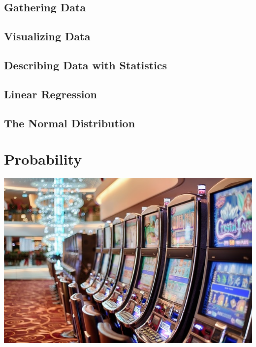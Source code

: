 \documentclass[9pt,letter,twoside,openright]{memoir}
\begin{document}
\section{Gathering Data}



\section{Visualizing Data}



\section{Describing Data with Statistics}



\section{Linear Regression}



\section{The Normal Distribution}



\chapter{Probability}
\begin{center}
\includegraphics[width=\textwidth]{casino}
\end{center}
\end{document}
